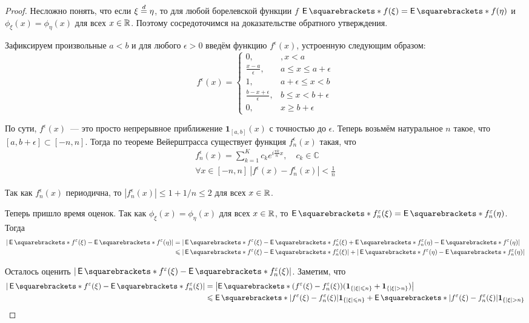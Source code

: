 \begin{proof}
	Несложно понять, что если \(\xi \overset{d}{=} \eta\), то для любой борелевской 
	функции \(f\) \(\E{f(\xi)} = \E{f(\eta)}\) и \(\phi_{\xi}(x) = 
	\phi_{\eta}(x)\) для всех \(x \in \mathbb{R}\). Поэтому сосредоточимся на 
	доказательстве обратного утверждения.
	
	Зафиксируем произвольные \(a < b\) и для любого \(\epsilon > 0\) введём 
	функцию \(f^{\epsilon}(x)\), устроенную следующим образом:
	\[
		f^{\epsilon}(x) = \begin{cases}
		0,&, x < a \\
		\frac{x - a}{\epsilon},& a \leq x \leq a + \epsilon \\
		1,& a + \epsilon \leq x < b \\
		\frac{b - x + \epsilon}{\epsilon},& b \leq x < b + \epsilon \\
		0, & x \geq b + \epsilon
		\end{cases}
	\]
	
	По сути, \(f^{\epsilon}(x)\)~--- это просто непрерывное приближение 
	\(\mathbf{1}_{[a, b]}(x)\) с точностью до \(\epsilon\). Теперь возьмём 
	натуральное \(n\) такое, что \([a, b + \epsilon] \subset [-n, n]\). Тогда 
	по теореме Вейерштрасса существует функция \(f_{n}^{\epsilon}(x)\) такая, 
	что
	\begin{gather*}
		f_{n}^{\epsilon}(x) = \sum_{k = 1}^{K} c_{k}e^{i\frac{\pi k}{n}x},\quad 
		c_{k} \in \mathbb{C} \\
		\forall x \in [-n, n]\ |f^{\epsilon}(x) - f_{n}^{\epsilon}(x)| < 
		\frac{1}{n}
	\end{gather*}

	Так как \(f_{n}^{\epsilon}(x)\) периодична, то \(|f_{n}^{\epsilon}(x)| \leq 
	1 + 1/n \leq 2\) для всех \(x \in \mathbb{R}\).
	
	Теперь пришло время оценок. Так как \(\phi_{\xi}(x) = \phi_{\eta}(x)\) для 
	всех \(x \in \mathbb{R}\), то \(\E{f_{n}^{\epsilon}(\xi)} = \E{ 
	f_{n}^{\epsilon}(\eta)}\). Тогда 
	\begin{align*}
		|\E{f^{\epsilon}(\xi)} - \E{f^{\epsilon}(\eta)}| &= 
		|\E{f^{\epsilon}(\xi)} - \E{f_{n}^{\epsilon}(\xi)} + \E{ 
		f_{n}^{\epsilon}(\eta)} - \E{f^{\epsilon}(\eta)}| \\
		&\leq |\E{f^{\epsilon}(\xi)} - \E{f_{n}^{\epsilon}(\xi)}| + 
		|\E{f^{\epsilon}(\eta)} - \E{ f_{n}^{\epsilon}(\eta)}|
	\end{align*}

	Осталось оценить \(|\E{f^{\epsilon}(\xi)} - \E{f_{n}^{\epsilon}(\xi)}|\). 	
	Заметим, что
	\begin{align*}
		|\E{f^{\epsilon}(\xi)} - \E{f_{n}^{\epsilon}(\xi)}| &= 
		\left|\E{(f^{\epsilon}(\xi) - f_{n}^{\epsilon}(\xi)) 
		(\mathbf{1}_{\{|\xi| \leq n\}} + \mathbf{1}_{\{|\xi| > n\}})}\right|\\
		&\leq \E{|f^{\epsilon}(\xi) - f_{n}^{\epsilon}(\xi)| 
		\mathbf{1}_{\{|\xi| \leq n\}}} + \E{|f^{\epsilon}(\xi) - 
		f_{n}^{\epsilon}(\xi)| \mathbf{1}_{\{|\xi| > n\}}}
	\end{align*}


\end{proof}
